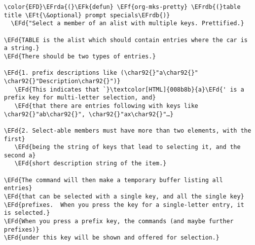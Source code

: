 \documentclass[c]{article}
\theoremstyle{plain}%
\theoremstyle{definition}
\theoremstyle{remark}
\newcommand{\EFd}[1]{\textcolor{EFd}{#1}} %
\newcommand{\EFk}[1]{\textcolor{EFk}{#1}} %
\newcommand{\EFf}[1]{\textcolor{EFf}{#1}} %
\newcommand{\EFt}[1]{\textcolor{EFt}{#1}} %
\newcommand{\EFrda}[1]{\textcolor{EFrda}{#1}} %
\newcommand{\EFrdb}[1]{\textcolor{EFrdb}{#1}} %
\begin{document}
\begin{Code}
\begin{Verbatim}
\color{EFD}\EFrda{(}\EFk{defun} \EFf{org-mks-pretty} \EFrdb{(}table title \EFt{\&optional} prompt specials\EFrdb{)}
  \EFd{"Select a member of an alist with multiple keys. Prettified.}

\EFd{TABLE is the alist which should contain entries where the car is a string.}
\EFd{There should be two types of entries.}

\EFd{1. prefix descriptions like (\char92{}"a\char92{}" \char92{}"Description\char92{}")}
   \EFd{This indicates that `}\textcolor[HTML]{008b8b}{a}\EFd{' is a prefix key for multi-letter selection, and}
   \EFd{that there are entries following with keys like \char92{}"ab\char92{}", \char92{}"ax\char92{}"…}

\EFd{2. Select-able members must have more than two elements, with the first}
   \EFd{being the string of keys that lead to selecting it, and the second a}
   \EFd{short description string of the item.}

\EFd{The command will then make a temporary buffer listing all entries}
\EFd{that can be selected with a single key, and all the single key}
\EFd{prefixes.  When you press the key for a single-letter entry, it is selected.}
\EFd{When you press a prefix key, the commands (and maybe further prefixes)}
\EFd{under this key will be shown and offered for selection.}


\end{Verbatim}
\end{Code}
\end{document}
